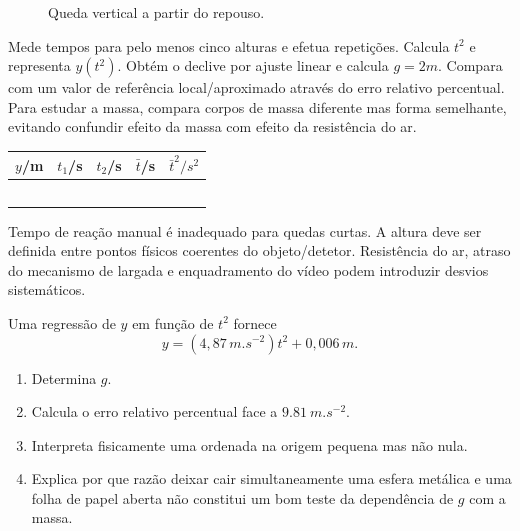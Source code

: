 \documentclass[11pt,a4paper,openany]{book}
\newcounter{exercicio}[chapter]
\renewcommand{\theexercicio}{\thechapter.\arabic{exercicio}}
\newenvironment{exercicio}[1][]%
{\refstepcounter{exercicio}%
\begin{tcolorbox}[breakable,colback=white,colframe=eublue!70,
 title={Exercício \theexercicio\if\relax\detokenize{#1}\relax\else\ --- #1\fi},fonttitle=\bfseries]}%
{\end{tcolorbox}}
\begin{document}
\begin{figure}[H]
\centering
{}
\caption{Queda vertical a partir do repouso.}
\end{figure}

\begin{metodo}
Mede tempos para pelo menos cinco alturas e efetua repetições. Calcula $t^2$ e representa $y(t^2)$. Obtém o declive por ajuste linear e calcula $g=2m$. Compara com um valor de referência local/aproximado através do erro relativo percentual. Para estudar a massa, compara corpos de massa diferente mas forma semelhante, evitando confundir efeito da massa com efeito da resistência do ar.
\end{metodo}

\begin{registo}
\begin{center}
\begin{tabular}{@{}ccccc@{}}
\toprule
$y$/m & $t_1$/s & $t_2$/s & $\bar t$/s & $\bar t^2/\si{s^2}$\\
\midrule
& & & &\\ & & & &\\ & & & &\\ & & & &\\ & & & &\\
\bottomrule
\end{tabular}
\end{center}
\end{registo}

\begin{erros}
Tempo de reação manual é inadequado para quedas curtas. A altura deve ser definida entre pontos físicos coerentes do objeto/detetor. Resistência do ar, atraso do mecanismo de largada e enquadramento do vídeo podem introduzir desvios sistemáticos.
\end{erros}

\begin{exercicio}[Determinar $g$]
Uma regressão de $y$ em função de $t^2$ fornece
\[
y=(4,87\,\si{m.s^{-2}})t^2+0,006\,\si{m}.
\]
\begin{enumerate}[label=\alph*)]
\item Determina $g$.
\item Calcula o erro relativo percentual face a $\SI{9.81}{m.s^{-2}}$.
\item Interpreta fisicamente uma ordenada na origem pequena mas não nula.
\item Explica por que razão deixar cair simultaneamente uma esfera metálica e uma folha de papel aberta não constitui um bom teste da dependência de $g$ com a massa.
\end{enumerate}
\end{exercicio}
\end{document}
